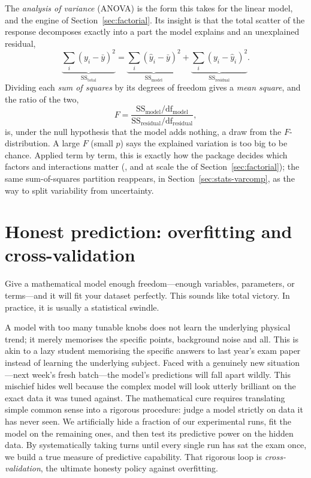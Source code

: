 The \emph{analysis of variance} (ANOVA) is the form this takes for the linear
model, and the engine of Section~\ref{sec:factorial}. Its insight is that the
total scatter of the response decomposes exactly into a part the model explains
and an unexplained residual,
%
\begin{equation}
\underbrace{\sum_i(y_i-\bar y)^2}_{\text{SS}_{\text{total}}}
=
\underbrace{\sum_i(\hat y_i-\bar y)^2}_{\text{SS}_{\text{model}}}
+
\underbrace{\sum_i(y_i-\hat y_i)^2}_{\text{SS}_{\text{residual}}} .
\label{eq:ssdecomp}
\end{equation}
%
Dividing each \emph{sum of squares} by its degrees of freedom gives a \emph{mean
square}, and the ratio of the two,
%
\begin{equation}
F = \frac{\text{SS}_{\text{model}}/\mathrm{df}_{\text{model}}}
         {\text{SS}_{\text{residual}}/\mathrm{df}_{\text{residual}}},
\label{eq:ftest}
\end{equation}
%
is, under the null hypothesis that the model adds nothing, a draw from the
$F$-distribution. A large $F$ (small $p$) says the explained variation is too
big to be chance. Applied term by term, this is exactly how the package decides
which factors and interactions matter (, and
at scale the  of Section~\ref{sec:factorial}); the same
sum-of-squares partition reappears, in Section~\ref{sec:stats-varcomp}, as the
way to split variability from uncertainty.

\section{Honest prediction: overfitting and cross-validation}
\label{sec:stats-cv}

Give a mathematical model enough freedom---enough variables, parameters, or terms---and it will fit your dataset perfectly.
This sounds like total victory. In practice, it is usually a statistical swindle.

A model with too many tunable knobs does not learn the underlying physical trend; it merely memorises the specific points,
background noise and all. This is akin to a lazy student memorising the specific answers to last year's exam paper instead
of learning the underlying subject. Faced with a genuinely new situation---next week's fresh batch---the model's predictions
will fall apart wildly. This mischief hides well because the complex model will look utterly brilliant on the exact data it
was tuned against. The mathematical cure requires translating simple common sense into a rigorous procedure: judge a model
strictly on data it has never seen. We artificially hide a fraction of our experimental runs, fit the model on the remaining ones,
and then test its predictive power on the hidden data. By systematically taking turns until every single run has sat the exam once,
we build a true measure of predictive capability. That rigorous loop is \emph{cross-validation}, the ultimate honesty policy
against overfitting.

